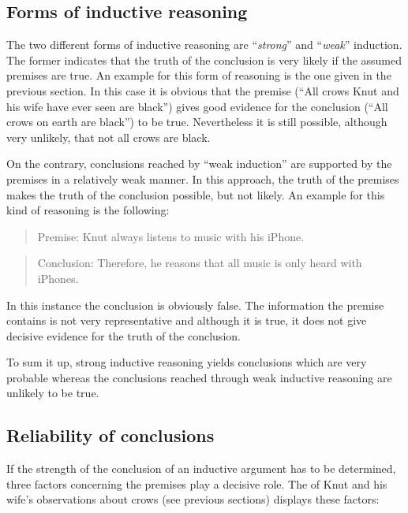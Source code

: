 \documentclass[
]{krantz}
\begin{document}
\subsection*{Forms of inductive reasoning}\label{forms-of-inductive-reasoning}


The two different forms of inductive reasoning are ``\emph{strong}'' and ``\emph{weak}'' induction. The former indicates that the truth of the conclusion is very likely if the assumed premises are true. An example for this form of reasoning is the one given in the previous section. In this case it is obvious that the premise (``All crows Knut and his wife have ever seen are black'') gives good evidence for the conclusion (``All crows on earth are black'') to be true. Nevertheless it is still possible, although very unlikely, that not all crows are black.

On the contrary, conclusions reached by ``weak induction'' are supported by the premises in a relatively weak manner. In this approach, the truth of the premises makes the truth of the conclusion possible, but not likely. An example for this kind of reasoning is the following:

\begin{quote}
Premise: Knut always listens to music with his iPhone.
\end{quote}

\begin{quote}
Conclusion: Therefore, he reasons that all music is only heard with iPhones.
\end{quote}

In this instance the conclusion is obviously false. The information the premise contains is not very representative and although it is true, it does not give decisive evidence for the truth of the conclusion.

To sum it up, strong inductive reasoning yields conclusions which are very probable whereas the conclusions reached through weak inductive reasoning are unlikely to be true.

\subsection*{Reliability of conclusions}\label{reliability-of-conclusions}


If the strength of the conclusion of an inductive argument has to be determined, three factors concerning the premises play a decisive role. The of Knut and his wife's observations about crows (see previous sections) displays these factors:
\end{document}
